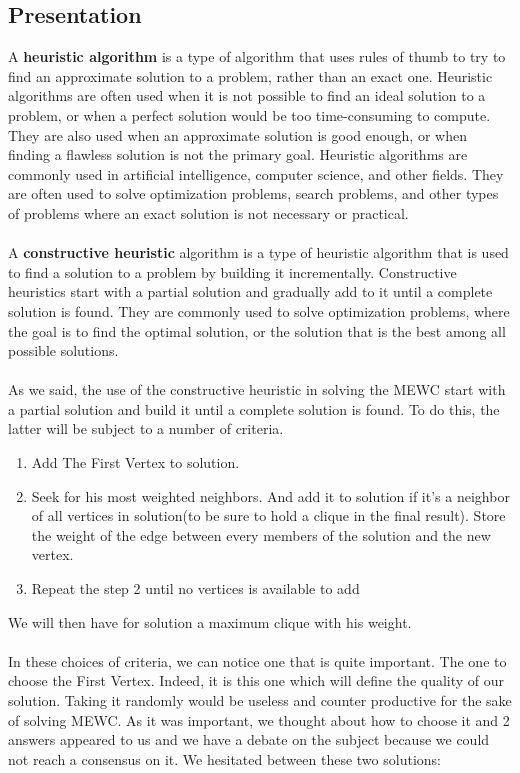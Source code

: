
\subsection{Presentation}

    A \textbf{heuristic algorithm} is a type of algorithm that uses rules of thumb to try to find an approximate solution to a problem, rather than an exact one. Heuristic algorithms are often used when it is not possible to find an ideal solution to a problem, or when a perfect solution would be too time-consuming to compute. They are also used when an approximate solution is good enough, or when finding a flawless solution is not the primary goal. Heuristic algorithms are commonly used in artificial intelligence, computer science, and other fields. They are often used to solve optimization problems, search problems, and other types of problems where an exact solution is not necessary or practical.
    \\ \\
    A \textbf{constructive heuristic} algorithm is a type of heuristic algorithm that is used to find a solution to a problem by building it incrementally. Constructive heuristics start with a partial solution and gradually add to it until a complete solution is found. They are commonly used to solve optimization problems, where the goal is to find the optimal solution, or the solution that is the best among all possible solutions.
    \\ \\
    As we said, the use of the constructive heuristic in solving the MEWC start with a partial solution and build it until a complete solution is found. To do this, the latter will be subject to a number of criteria. 

    \begin{enumerate}
        \item Add The First Vertex to solution.
        \item Seek for his most weighted neighbors. And add it to solution if it's a neighbor of all vertices in solution(to be sure to hold a clique in the final result). Store the weight of the edge between every members of the solution and the new vertex.
        \item Repeat the step 2 until no vertices is available to add
    \end{enumerate}

    We will then have for solution a maximum clique with his weight. 
    \\ \\
    In these choices of criteria, we can notice one that is quite important. The one to choose the First Vertex. Indeed, it is this one which will define the quality of our solution. Taking it randomly would be useless and counter productive for the sake of solving MEWC. As it was important, we thought about how to choose it and 2 answers appeared to us and we have a debate on the subject because we could not reach a consensus on it. We hesitated between these two solutions:

